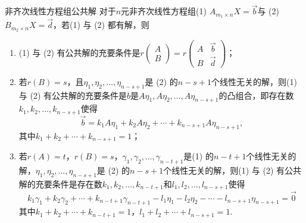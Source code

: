 \begin{theorem}{}{非齐次线性方程组公共解}
    对于$n$元非齐次线性方程组(1) $A_{m_1 \times n}X=\vec{b}$与 (2) $B_{m_2 \times n}X=\vec{d}$，若(1) 与 (2) 都有解，则
    \begin{enumerate}
        \item (1) 与 (2) 有公共解的充要条件是$r\begin{pmatrix}
                      A \\ B
                  \end{pmatrix}=r\begin{pmatrix}
                      A & \vec{b} \\ B & \vec{d}
                  \end{pmatrix}$；

        \item 若$r(B)=s$，且$\eta_1,\eta_2,\ldots,\eta_{n-s+1}$是 (2) 的$n-s+1$个线性无关的解，则(1) 与 (2) 有公共解的充要条件是$b$是$A\eta_1,A\eta_2,\ldots,A\eta_{n-s+1}$的凸组合，即存在数$k_1,k_2,\ldots,k_{n-s+1}$使得
              \[\vec{b}=k_1A\eta_1+k_2A\eta_2+\cdots+k_{n-s+1}A\eta_{n-s+1},\]
              其中$k_1+k_2+\cdots+k_{n-s+1}=1$；

        \item 若$r(A)=t$，$r(B)=s$，$\gamma_1,\gamma_2,\ldots,\gamma_{n-t+1}$是(1) 的$n-t+1$个线性无关的解，$\eta_1,\eta_2,\ldots,\eta_{n-s+1}$是 (2) 的$n-s+1$个线性无关的解，则(1) 与 (2) 有公共解的充要条件是存在数$k_1,k_2,\ldots,k_{n-t+1}$和$l_1,l_2,\ldots,l_{n-s+1}$使得
              \[k_1\gamma_1+k_2\gamma_2+\cdots+k_{n-t+1}\gamma_{n-t+1}-l_1\eta_1-l_2\eta_2-\cdots-l_{n-s+1}\eta_{n-s+1}=\vec{0}\]
              其中$k_1+k_2+\cdots+k_{n-t+1}=1$，$l_1+l_2+\cdots+l_{n-s+1}=1$.
    \end{enumerate}
\end{theorem}

